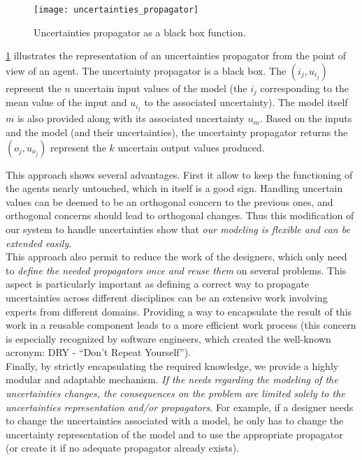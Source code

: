 \begin{figure}
\center
\texttt{[image: uncertainties\_propagator]}
\caption{Uncertainties propagator as a black box function.}\label{uncertainties_propagator}
\end{figure}

\figurename{} \ref{uncertainties_propagator} illustrates the representation of an uncertainties propagator from the point of view of an agent. The uncertainty propagator is a black box. The $(i_j, u_{i_j})$ represent the $n$ uncertain input values of the model (the $i_j$ corresponding to the mean value of the input and $u_{i_j}$ to the associated uncertainty). The model itself $m$ is also provided along with its associated uncertainty $u_m$. Based on the inputs and the model (and their uncertainties), the uncertainty propagator returns the $(o_j, u_{o_j})$ represent the $k$ uncertain output values produced.

This approach shows several advantages. First it allow to keep the functioning of the agents nearly untouched, which in itself is a good sign. Handling uncertain values can be deemed to be an orthogonal concern to the previous ones, and orthogonal concerns should lead to orthogonal changes. Thus this modification of our system to handle uncertainties show that \emph{our modeling is flexible and can be extended easily}.\\
This approach also permit to reduce the work of the designers, which only need to \emph{define the needed propagators once and reuse them} on several problems. This aspect is particularly important as defining a correct way to propagate uncertainties across different disciplines can be an extensive work involving experts from different domains. Providing a way to encapsulate the result of this work in a reusable component leads to a more efficient work process (this concern is especially recognized by software engineers, which created the well-known acronym: DRY - \enquote{Don't Repeat Yourself}).\\
Finally, by strictly encapsulating the required knowledge, we provide a highly modular and adaptable mechanism. \emph{If the needs regarding the modeling of the uncertainties changes, the consequences on the problem are limited solely to the uncertainties representation and/or propagators}. For example, if a designer needs to change the uncertainties associated with a model, he only has to change the uncertainty representation of the model and to use the appropriate propagator (or create it if no adequate propagator already exists).

